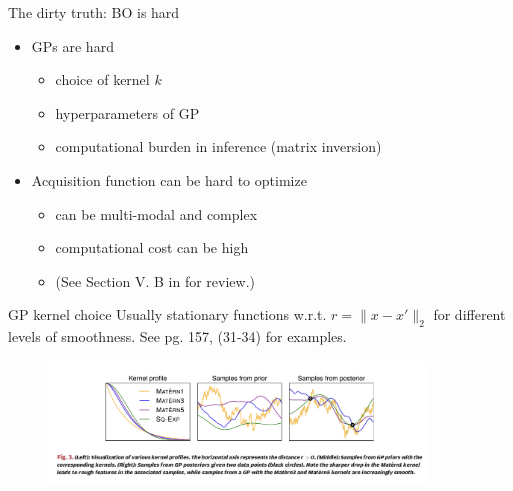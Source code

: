 \documentclass[aspectratio=169]{beamer}					%
\begin{document}
\begin{frame}{The dirty truth: BO is hard}
	\begin{itemize}
		\item GPs are hard
		\begin{itemize}
			\item choice of kernel $k$
			\item hyperparameters of GP
			\item computational burden in inference (matrix inversion)
		\end{itemize}
		\item Acquisition function can be hard to optimize
		\begin{itemize}
			\item can be multi-modal and complex
			\item computational cost can be high
			\item (See Section V. B in \cite{shahriari2015taking} for review.)
		\end{itemize}
	\end{itemize}
\end{frame}

\begin{frame}{GP kernel choice}
	Usually stationary functions w.r.t. $r = \lVert x - x' \rVert_2$ for different levels of smoothness. See \cite{shahriari2015taking} pg. 157, (31-34) for examples. 
	
	\pause
	
	\begin{figure}
		\centering
		\includegraphics[width = 0.9\textwidth]{figures/kernel-function-examples.png}
	\end{figure}
	
	
\end{frame}
\end{document}
